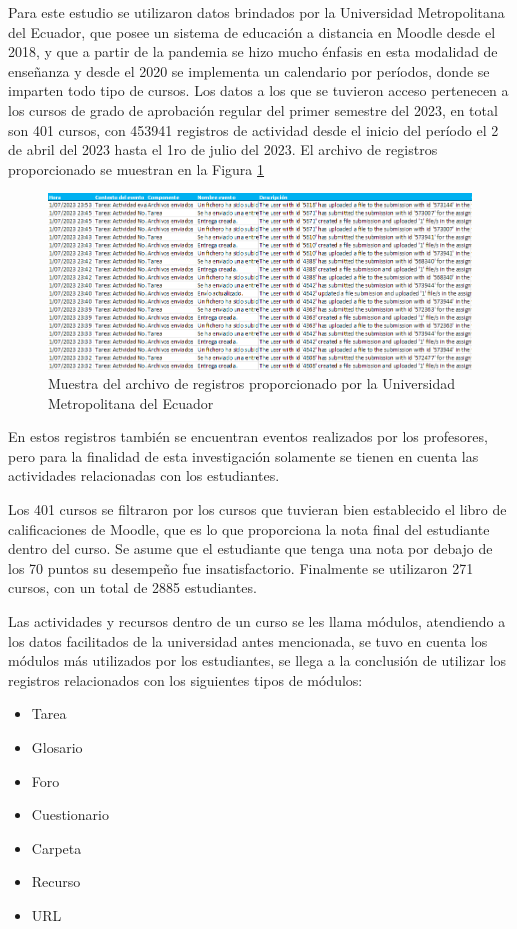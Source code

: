 Para este estudio se utilizaron datos brindados por la Universidad Metropolitana del Ecuador, que posee un sistema de educación a distancia en Moodle desde el 2018, y que a partir de la pandemia se hizo mucho énfasis en esta modalidad de enseñanza y desde el 2020 se implementa un calendario por períodos, donde se imparten todo tipo de cursos. Los datos a los que se tuvieron acceso pertenecen a los cursos de grado de aprobación regular del primer semestre del 2023, en total son 401 cursos, con 453941 registros de actividad desde el inicio del período el 2 de abril del 2023 hasta el 1ro de julio del 2023. El archivo de registros proporcionado se muestran en la Figura \ref{Logs} 
\begin{figure}[htb]
    \centering
    \includegraphics[width = 1 \textwidth]{Graphics/Pasted image 20231227101635.png}
    \caption{Muestra del archivo de registros proporcionado por la Universidad Metropolitana del Ecuador}
    \label{Logs}
\end{figure}

En estos registros también se encuentran eventos realizados por los profesores, pero para la finalidad de esta investigación solamente se tienen en cuenta las actividades relacionadas con los estudiantes.  


Los 401 cursos se filtraron por los cursos que tuvieran bien establecido el libro de calificaciones de Moodle, que es lo que proporciona la nota final del estudiante dentro del curso. Se asume que el estudiante que tenga una nota por debajo de los 70 puntos su desempeño fue insatisfactorio. Finalmente se utilizaron 271 cursos, con un total de 2885 estudiantes.  


Las actividades y recursos dentro de un curso se les llama módulos, atendiendo a los datos facilitados de la universidad antes mencionada, se tuvo en cuenta los módulos más utilizados por los estudiantes, se llega a la conclusión de utilizar los registros relacionados con los siguientes tipos de módulos:   
\begin{itemize}
    \item Tarea
    \item Glosario
    \item Foro
    \item Cuestionario
    \item Carpeta
    \item Recurso
    \item URL
\end{itemize}
    
